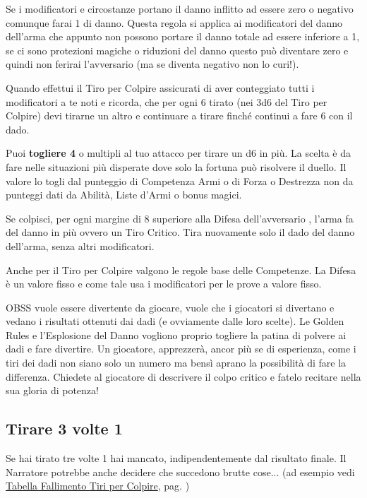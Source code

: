 \begin{multicols}{2}
Se i modificatori e circostanze portano il danno inflitto ad essere zero o negativo comunque farai 1 di danno.
Questa regola si applica ai modificatori del danno dell'arma che appunto non possono portare il danno totale ad essere inferiore a 1, se ci sono protezioni magiche o riduzioni del danno questo può diventare zero e quindi non ferirai l'avversario (ma se diventa negativo non lo curi!).

Quando effettui il Tiro per Colpire assicurati di aver conteggiato tutti i modificatori a te noti e ricorda, che per ogni 6 tirato (nei 3d6 del Tiro per Colpire) devi tirarne un altro e continuare a tirare finché continui a fare 6 con il dado.

Puoi \textbf{togliere 4} o multipli al tuo attacco per tirare un d6 in più. La scelta è da fare nelle situazioni più disperate dove solo la fortuna può risolvere il duello. Il valore lo togli dal punteggio di Competenza Armi o di Forza o Destrezza non da punteggi dati da Abilità, Liste d'Armi o bonus magici.

Se colpisci, per ogni margine di 8 superiore alla Difesa dell'avversario , l'arma fa del danno in più ovvero un Tiro Critico. Tira nuovamente solo il dado del danno dell'arma, senza altri modificatori.

Anche per il Tiro per Colpire valgono le regole base delle Competenze. La Difesa è un valore fisso e come tale usa i modificatori per le prove a valore fisso.

\begin{narratore}[Partecipazione]
OBSS vuole essere divertente da giocare, vuole che i giocatori si divertano e vedano i risultati ottenuti dai dadi (e ovviamente dalle loro scelte). Le Golden Rules e l'Esplosione del Danno vogliono proprio togliere la patina di polvere ai dadi e fare divertire. Un giocatore, apprezzerà, ancor più se di esperienza, come i tiri dei dadi non siano solo un numero ma bensì aprano la possibilità di fare la differenza. Chiedete al giocatore di descrivere il colpo critico e fatelo recitare nella sua gloria di potenza!
\end{narratore}

\subsection{Tirare 3 volte 1}\label{tiraretrevolteuno}

Se hai tirato tre volte 1 hai mancato, indipendentemente dal risultato finale. Il Narratore potrebbe anche decidere che succedono brutte cose... (ad esempio vedi \hyperlink{tabellafallimentiarmi}{Tabella Fallimento Tiri per Colpire}, pag. \pageref{tabellafallimentiarmi})



\end{multicols}
